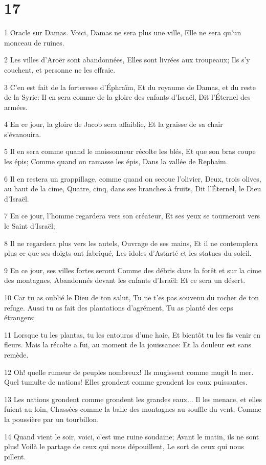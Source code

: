\chapter{17}

\par 1 Oracle sur Damas. Voici, Damas ne sera plus une ville, Elle ne sera qu'un monceau de ruines.
\par 2 Les villes d'Aroër sont abandonnées, Elles sont livrées aux troupeaux; Ils s'y couchent, et personne ne les effraie.
\par 3 C'en est fait de la forteresse d'Éphraïm, Et du royaume de Damas, et du reste de la Syrie: Il en sera comme de la gloire des enfants d'Israël, Dit l'Éternel des armées.
\par 4 En ce jour, la gloire de Jacob sera affaiblie, Et la graisse de sa chair s'évanouira.
\par 5 Il en sera comme quand le moissonneur récolte les blés, Et que son bras coupe les épis; Comme quand on ramasse les épis, Dans la vallée de Rephaïm.
\par 6 Il en restera un grappillage, comme quand on secoue l'olivier, Deux, trois olives, au haut de la cime, Quatre, cinq, dans ses branches à fruits, Dit l'Éternel, le Dieu d'Israël.
\par 7 En ce jour, l'homme regardera vers son créateur, Et ses yeux se tourneront vers le Saint d'Israël;
\par 8 Il ne regardera plus vers les autels, Ouvrage de ses mains, Et il ne contemplera plus ce que ses doigts ont fabriqué, Les idoles d'Astarté et les statues du soleil.
\par 9 En ce jour, ses villes fortes seront Comme des débris dans la forêt et sur la cime des montagnes, Abandonnés devant les enfants d'Israël: Et ce sera un désert.
\par 10 Car tu as oublié le Dieu de ton salut, Tu ne t'es pas souvenu du rocher de ton refuge. Aussi tu as fait des plantations d'agrément, Tu as planté des ceps étrangers;
\par 11 Lorsque tu les plantas, tu les entouras d'une haie, Et bientôt tu les fis venir en fleurs. Mais la récolte a fui, au moment de la jouissance: Et la douleur est sans remède.
\par 12 Oh! quelle rumeur de peuples nombreux! Ils mugissent comme mugit la mer. Quel tumulte de nations! Elles grondent comme grondent les eaux puissantes.
\par 13 Les nations grondent comme grondent les grandes eaux... Il les menace, et elles fuient au loin, Chassées comme la balle des montagnes au souffle du vent, Comme la poussière par un tourbillon.
\par 14 Quand vient le soir, voici, c'est une ruine soudaine; Avant le matin, ils ne sont plus! Voilà le partage de ceux qui nous dépouillent, Le sort de ceux qui nous pillent.

